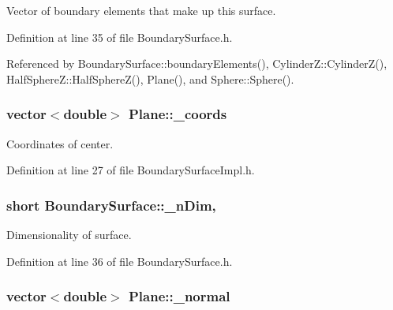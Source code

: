 Vector of boundary elements that make up this surface. 



Definition at line 35 of file Boundary\+Surface.\+h.



Referenced by Boundary\+Surface\+::boundary\+Elements(), Cylinder\+Z\+::\+Cylinder\+Z(), Half\+Sphere\+Z\+::\+Half\+Sphere\+Z(), Plane(), and Sphere\+::\+Sphere().

\hypertarget{classPlane_a32fa0ece7f71d852ea003a1f9164e47d}{
\subsubsection[{\+\_\+coords}]{\setlength{\rightskip}{0pt plus 5cm}vector$<$double$>$ Plane\+::\+\_\+coords\hspace{0.3cm}{\ttfamily [private]}}}\label{classPlane_a32fa0ece7f71d852ea003a1f9164e47d}


Coordinates of center. 



Definition at line 27 of file Boundary\+Surface\+Impl.\+h.

\hypertarget{classBoundarySurface_af3ed79310c6ba6cdc8e9f176bf463eb1}{
\subsubsection[{\+\_\+n\+Dim}]{\setlength{\rightskip}{0pt plus 5cm}short Boundary\+Surface\+::\+\_\+n\+Dim\hspace{0.3cm}{\ttfamily [protected]}, {\ttfamily [inherited]}}}\label{classBoundarySurface_af3ed79310c6ba6cdc8e9f176bf463eb1}


Dimensionality of surface. 



Definition at line 36 of file Boundary\+Surface.\+h.

\hypertarget{classPlane_a99a66d59b7e19f5c1562b9129611d9fb}{
\subsubsection[{\+\_\+normal}]{\setlength{\rightskip}{0pt plus 5cm}vector$<$double$>$ Plane\+::\+\_\+normal\hspace{0.3cm}{\ttfamily [private]}}}\label{classPlane_a99a66d59b7e19f5c1562b9129611d9fb}


